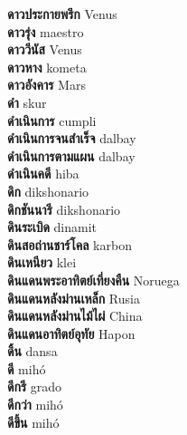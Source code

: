 \textbf{ ดาวประกายพรึก  } Venus \\
\textbf{ ดาวรุ่ง  } maestro \\
\textbf{ ดาววีนัส  } Venus \\
\textbf{ ดาวหาง  } kometa \\
\textbf{ ดาวอังคาร  } Mars \\
\textbf{ ดำ  } skur \\
\textbf{ ดำเนินการ  } cumpli \\
\textbf{ ดำเนินการจนสำเร็จ  } dalbay \\
\textbf{ ดำเนินการตามแผน  } dalbay \\
\textbf{ ดำเนินคดี  } hiba \\
\textbf{ ดิก  } dikshonario \\
\textbf{ ดิกชันนารี  } dikshonario \\
\textbf{ ดินระเบิด  } dinamit \\
\textbf{ ดินสอถ่านชาร์โคล  } karbon \\
\textbf{ ดินเหนียว  } klei \\
\textbf{ ดินแดนพระอาทิตย์เที่ยงคืน  } Noruega \\
\textbf{ ดินแดนหลังม่านเหล็ก  } Rusia \\
\textbf{ ดินแดนหลังม่านไม้ไผ่  } China \\
\textbf{ ดินแดนอาทิตย์อุทัย  } Hapon \\
\textbf{ ดิ้น  } dansa \\
\textbf{ ดี  } mihó \\
\textbf{ ดีกรี  } grado \\
\textbf{ ดีกว่า  } mihó \\
\textbf{ ดีขึ้น  } mihó \\
